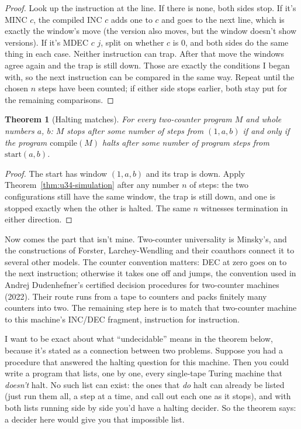 \documentclass[11pt,twoside]{article}
\theoremstyle{thielethm}
\newtheorem{theorem}{Theorem}[section]
\theoremstyle{thieledef}
\theoremstyle{thieledef}
\theoremstyle{thieledef}
\theoremstyle{thielethm}
\theoremstyle{thieleobs}
\theoremstyle{thielethm}
\begin{document}
\begin{proof}
Look up the instruction at the line. If there is none, both sides stop. If it's MINC $c$,
the compiled INC $c$ adds one to $c$ and goes to the next line, which is exactly the
window's move (the version also moves, but the window doesn't show versions). If it's MDEC
$c$ $j$, split on whether $c$ is 0, and both sides do the same thing in each case. Neither
instruction can trap. After that move the windows agree again and the trap is still down. Those
are exactly the conditions I began with, so the next instruction can be
compared in the same way. Repeat until the chosen $n$ steps have been counted;
if either side stops earlier, both stay put for the remaining comparisons.
\end{proof}

\begin{theorem}[Halting matches]\label{thm:u34-halting}
For every two-counter program $M$ and whole numbers $a$, $b$: $M$ stops after some number of
steps from $(1, a, b)$ if and only if the program $\mathrm{compile}(M)$ halts after some
number of program steps from $\mathrm{start}(a, b)$.
\end{theorem}

\begin{proof}
The start has window $(1,a,b)$ and its trap is down. Apply
Theorem~\ref{thm:u34-simulation} after any number $n$ of steps: the two configurations
still have the same window, the trap is still down, and one is stopped exactly when
the other is halted. The same $n$ witnesses termination in either direction.
\end{proof}

Now comes the part that isn't mine. Two-counter universality is Minsky's, and the constructions
of Forster, Larchey-Wendling and their coauthors connect it to several other models.
The counter convention matters: DEC at zero goes on to the next instruction; otherwise
it takes one off and jumps, the convention used in Andrej Dudenhefner's certified decision procedures
for two-counter machines (2022). Their route runs
from a tape to counters and packs finitely many counters into two. The remaining step here is to match that two-counter machine to this
machine's INC/DEC fragment, instruction for instruction.

I want to be exact about what ``undecidable'' means in the theorem below, because it's
stated as a connection between two problems. Suppose you had a procedure that answered the
halting question for this machine. Then you could write a program that lists, one by one,
every single-tape Turing machine that \emph{doesn't} halt. No such list can exist: the ones
that \emph{do} halt can already be listed (just run them all, a step at a time, and call out
each one as it stops), and with both lists running side by side you'd have a halting
decider. So the theorem says: a decider here would give you that impossible list.
\end{document}
